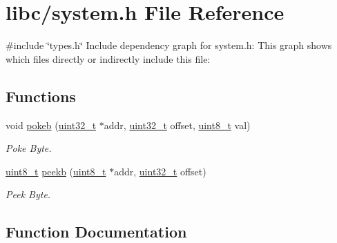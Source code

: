 \hypertarget{a00023}{}\section{libc/system.h File Reference}
\label{a00023}
{\ttfamily \#include \char`\"{}types.\+h\char`\"{}}\newline
Include dependency graph for system.\+h\+:
This graph shows which files directly or indirectly include this file\+:
\subsection*{Functions}
\begin{DoxyCompactItemize}
\item 
void \hyperlink{a00023_aa291c9926b84df379482632e80ec7c47_aa291c9926b84df379482632e80ec7c47}{pokeb} (\hyperlink{a00026_a435d1572bf3f880d55459d9805097f62_a435d1572bf3f880d55459d9805097f62}{uint32\+\_\+t} $\ast$addr, \hyperlink{a00026_a435d1572bf3f880d55459d9805097f62_a435d1572bf3f880d55459d9805097f62}{uint32\+\_\+t} offset, \hyperlink{a00026_aba7bc1797add20fe3efdf37ced1182c5_aba7bc1797add20fe3efdf37ced1182c5}{uint8\+\_\+t} val)
\begin{DoxyCompactList}\small\item\em Poke Byte. \end{DoxyCompactList}\item 
\hyperlink{a00026_aba7bc1797add20fe3efdf37ced1182c5_aba7bc1797add20fe3efdf37ced1182c5}{uint8\+\_\+t} \hyperlink{a00023_a353956c1fd65c7ed787836534fc9354e_a353956c1fd65c7ed787836534fc9354e}{peekb} (\hyperlink{a00026_aba7bc1797add20fe3efdf37ced1182c5_aba7bc1797add20fe3efdf37ced1182c5}{uint8\+\_\+t} $\ast$addr, \hyperlink{a00026_a435d1572bf3f880d55459d9805097f62_a435d1572bf3f880d55459d9805097f62}{uint32\+\_\+t} offset)
\begin{DoxyCompactList}\small\item\em Peek Byte. \end{DoxyCompactList}\end{DoxyCompactItemize}


\subsection{Function Documentation}
\mbox{\label{a00023_a353956c1fd65c7ed787836534fc9354e_a353956c1fd65c7ed787836534fc9354e}} 

